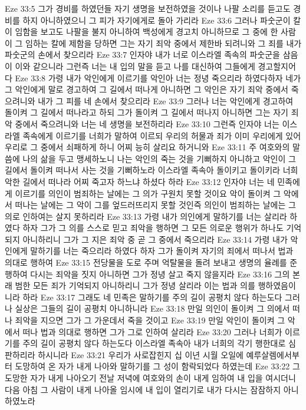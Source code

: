 Eze 33:5  그가 경비를 하였던들 자기 생명을 보전하였을 것이나 나팔 소리를 듣고도 경비를 하지 아니하였으니 그 피가 자기에게로 돌아 가리라
Eze 33:6  그러나 파숫군이 칼이 임함을 보고도 나팔을 불지 아니하여 백성에게 경고치 아니하므로 그 중에 한 사람이 그 임하는 칼에 제함을 당하면 그는 자기 죄악 중에서 제한바 되려니와 그 죄를 내가 파숫군의 손에서 찾으리라
Eze 33:7  인자야 내가 너로 이스라엘 족속의 파숫군을 삼음이 이와 같으니라 그런즉 너는 내 입의 말을 듣고 나를 대신하여 그들에게 경고할지어다
Eze 33:8  가령 내가 악인에게 이르기를 악인아 너는 정녕 죽으리라 하였다하자 네가 그 악인에게 말로 경고하여 그 길에서 떠나게 아니하면 그 악인은 자기 죄악 중에서 죽으려니와 내가 그 피를 네 손에서 찾으리라
Eze 33:9  그러나 너는 악인에게 경고하여 돌이켜 그 길에서 떠나라고 하되 그가 돌이켜 그 길에서 떠나지 아니하면 그는 자기 죄악 중에서 죽으려니와 너는 네 생명을 보전하리라
Eze 33:10  그런즉 인자야 너는 이스라엘 족속에게 이르기를 너희가 말하여 이르되 우리의 허물과 죄가 이미 우리에게 있어 우리로 그 중에서 쇠패하게 하니 어찌 능히 살리요 하거니와
Eze 33:11  주 여호와의 말씀에 나의 삶을 두고 맹세하노니 나는 악인의 죽는 것을 기뻐하지 아니하고 악인이 그 길에서 돌이켜 떠나서 사는 것을 기뻐하노라 이스라엘 족속아 돌이키고 돌이키라 너희 악한 길에서 떠나라 어찌 죽고자 하느냐 하셨다 하라
Eze 33:12  인자야 너는 네 민족에게 이르기를 의인이 범죄하는 날에는 그 의가 구원치 못할 것이요 악이 돌이켜 그 악에서 떠나는 날에는 그 악이 그를 엎드러뜨리지 못할 것인즉 의인이 범죄하는 날에는 그 의로 인하여는 살지 못하리라
Eze 33:13  가령 내가 의인에게 말하기를 너는 살리라 하였다 하자 그가 그 의를 스스로 믿고 죄악을 행하면 그 모든 의로운 행위가 하나도 기억되지 아니하리니 그가 그 지은 죄악 중 곧 그 중에서 죽으리라
Eze 33:14  가령 내가 악인에게 말하기를 너는 죽으리라 하였다 하자 그가 돌이켜 자기의 죄에서 떠나서 법과 의대로 행하여
Eze 33:15  전당물을 도로 주며 억탈물을 돌려 보내고 생명의 율례를 준행하여 다시는 죄악을 짓지 아니하면 그가 정녕 살고 죽지 않을지라
Eze 33:16  그의 본래 범한 모든 죄가 기억되지 아니하리니 그가 정녕 살리라 이는 법과 의를 행하였음이니라 하라
Eze 33:17  그래도 네 민족은 말하기를 주의 길이 공평치 않다 하는도다 그러나 실상은 그들의 길이 공평치 아니하니라
Eze 33:18  만일 의인이 돌이켜 그 의에서 떠나 죄악을 지으면 그가 그 가운데서 죽을 것이고
Eze 33:19  만일 악인이 돌이켜 그 악에서 떠나 법과 의대로 행하면 그가 그로 인하여 살리라
Eze 33:20  그러나 너희가 이르기를 주의 길이 공평치 않다 하는도다 이스라엘 족속아 내가 너희의 각기 행한대로 심판하리라 하시니라
Eze 33:21  우리가 사로잡힌지 십 이년 시월 오일에 예루살렘에서부터 도망하여 온 자가 내게 나아와 말하기를 그 성이 함락되었다 하였는데
Eze 33:22  그 도망한 자가 내게 나아오기 전날 저녁에 여호와의 손이 내게 임하여 내 입을 여시더니 다음 아침 그 사람이 내게 나아올 임시에 내 입이 열리기로 내가 다시는 잠잠하지 아니하였노라
